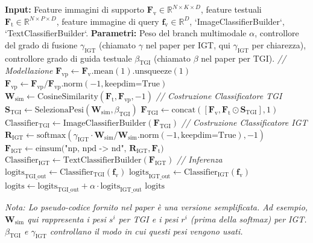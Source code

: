 \documentclass[11pt,a4paper]{article}
\newcommand{\Ft}{\mathbf{F}_\text{t}}      %
\newcommand{\Fv}{\mathbf{F}_\text{v}}      %
\newcommand{\fv}{\mathbf{f}_\text{v}}      %
\newcommand{\Figt}{\mathbf{F}_\text{IGT}}  %
\newcommand{\Ftgi}{\mathbf{F}_\text{TGI}}  %
\newcommand{\R}{\mathbb{R}}
\begin{document}
\begin{algorithm}[H]
\caption{Algoritmo principale di TIMO}
\label{alg:timo}
\begin{algorithmic}[1]
\State \textbf{Input:} Feature immagini di supporto $\Fv \in \R^{N \times K \times D}$, feature testuali $\Ft \in \R^{N \times P \times D}$, feature immagine di query $\fv \in \R^D$, `ImageClassifierBuilder`, `TextClassifierBuilder`.
\State \textbf{Parametri:} Peso del branch multimodale $\alpha$, controllore del grado di fusione $\gamma_{\text{IGT}}$ (chiamato $\gamma$ nel paper per IGT, qui $\gamma_{\text{IGT}}$ per chiarezza), controllore grado di guida testuale $\beta_{\text{TGI}}$ (chiamato $\beta$ nel paper per TGI).
\Statex
\State \textit{// Modellazione}
\State $\mathbf{F}_{\text{vp}} \gets \Fv.\text{mean}(1).\text{unsqueeze}(1)$ 
\State $\mathbf{F}_{\text{vp}} \gets \mathbf{F}_{\text{vp}} / \mathbf{F}_{\text{vp}}.\text{norm}(-1, \text{keepdim=True})$ 
\State $\mathbf{W}_{\text{sim}} \gets \text{CosineSimilarity}(\Ft, \mathbf{F}_{\text{vp}}, -1)$ 
\Statex
\State \textit{// Costruzione Classificatore TGI}
\State $\mathbf{S}_{\text{TGI}} \gets \text{SelezionaPesi}(\mathbf{W}_{\text{sim}}, \beta_{\text{TGI}})$ 
\State $\Ftgi \gets \text{concat}([\Fv, \Ft \odot \mathbf{S}_{\text{TGI}}], 1)$ 
\State $\text{Classifier}_{\text{TGI}} \gets \text{ImageClassifierBuilder}(\Ftgi)$
\Statex
\State \textit{// Costruzione Classificatore IGT}
\State $\mathbf{R}_{\text{IGT}} \gets \text{softmax}(\gamma_{\text{IGT}} \cdot \mathbf{W}_{\text{sim}} / \mathbf{W}_{\text{sim}}.\text{norm}(-1, \text{keepdim=True}), -1)$
\State $\Figt \gets \text{einsum("np, npd -> nd", } \mathbf{R}_{\text{IGT}}, \Ft \text{)}$ 
\State $\text{Classifier}_{\text{IGT}} \gets \text{TextClassifierBuilder}(\Figt)$
\Statex
\State \textit{// Inferenza}
\State $\text{logits}_{\text{TGI\_out}} \gets \text{Classifier}_{\text{TGI}}(\fv)$
\State $\text{logits}_{\text{IGT\_out}} \gets \text{Classifier}_{\text{IGT}}(\fv)$
\State $\text{logits} \gets \text{logits}_{\text{TGI\_out}} + \alpha \cdot \text{logits}_{\text{IGT\_out}}$
\State \Return $\text{logits}$
\end{algorithmic}
\end{algorithm}
\textit{Nota: Lo pseudo-codice fornito nel paper è una versione semplificata. Ad esempio, $\mathbf{W}_{\text{sim}}$ qui rappresenta i pesi $s^i$ per TGI e i pesi $r^i$ (prima della softmax) per IGT. $\beta_{\text{TGI}}$ e $\gamma_{\text{IGT}}$ controllano il modo in cui questi pesi vengono usati.}
\end{document}
